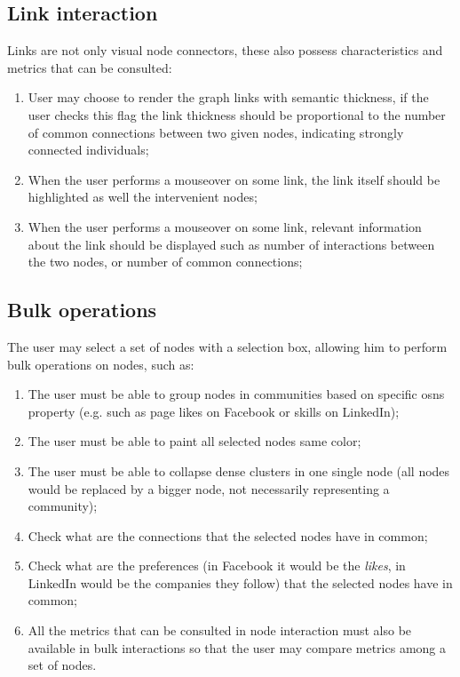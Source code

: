 \subsection{Link interaction}

Links are not only visual node connectors, these also possess characteristics and metrics that can be consulted:
\begin{enumerate}
    \item User may choose to render the graph links with semantic thickness, if the user checks this flag the link thickness should be
    proportional to the number of common connections between two given nodes, indicating strongly connected individuals;
    \item When the user performs a mouseover on some link, the link itself should be highlighted as well the intervenient nodes;
    \item When the user performs a mouseover on some link, relevant information about the link should be displayed such as number of interactions between the two nodes, or number of common connections;
\end{enumerate}

\subsection{Bulk operations}

The user may select a set of nodes with a selection box, allowing him to perform bulk operations on nodes, such as:
\begin{enumerate}
    \item The user must be able to group nodes in communities based on specific \glspl{osn} property (e.g. such as page likes on Facebook or skills on LinkedIn);
    \item The user must be able to paint all selected nodes same color;
    \item The user must be able to collapse dense clusters in one single node (all nodes would be replaced by a bigger node, not necessarily representing a community); %
    \item Check what are the connections that the selected nodes have in common;
    \item Check what are the preferences (in Facebook it would be the \textit{likes}, in LinkedIn would be the companies they follow) that the selected nodes have in common;
    \item All the metrics that can be consulted in node interaction must also be available in bulk interactions so that the user may compare metrics among a set of
    nodes.
\end{enumerate}

